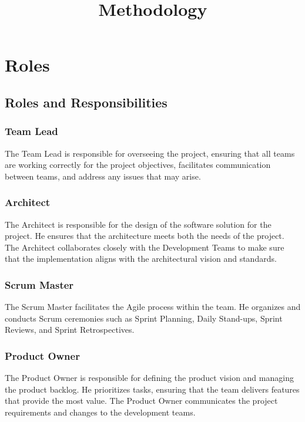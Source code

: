 \documentclass{article}
\title{Methodology}
\author{}
\date{}
\begin{document}
\maketitle

\hypertarget{roles}{
\section{Roles}\label{roles}}

\hypertarget{roles-res}{
\subsection{Roles and Responsibilities}\label{roles-res}}

\hypertarget{teamlead}{
\subsubsection{Team Lead}\label{teamlead}}
The Team Lead is responsible for overseeing the project, ensuring that all teams are working correctly for the project objectives, facilitates communication between teams, and address any issues that may arise.

\hypertarget{architec}{
\subsubsection{Architect}\label{architec}}
The Architect is responsible for the design of the software solution for the project. He ensures that the architecture meets both the needs of the project. The Architect collaborates closely with the Development Teams to make sure that the implementation aligns with the architectural vision and standards.

\hypertarget{scrummaster}{
\subsubsection{Scrum Master}\label{scrummaster}}
The Scrum Master facilitates the Agile process within the team. He organizes and conducts Scrum ceremonies such as Sprint Planning, Daily Stand-ups, Sprint Reviews, and Sprint Retrospectives.

\hypertarget{po}{
\subsubsection{Product Owner}\label{po}}
The Product Owner is responsible for defining the product vision and managing the product backlog. He prioritizes tasks, ensuring that the team delivers features that provide the most value. The Product Owner communicates the project requirements and changes to the development teams.
\end{document}
